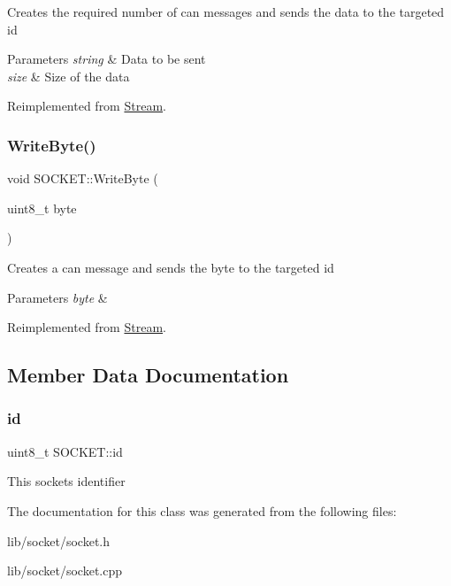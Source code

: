 Creates the required number of can messages and sends the data to the targeted id 
\begin{DoxyParams}{Parameters}
{\em string} & Data to be sent \\
\hline
{\em size} & Size of the data \\
\hline
\end{DoxyParams}


Reimplemented from \hyperlink{class_stream_a508be3423e4d99ab2757275fb723002a}{Stream}.

\hypertarget{class_s_o_c_k_e_t_abcddb460b7adf3595a813f08f3659356}{}\label{class_s_o_c_k_e_t_abcddb460b7adf3595a813f08f3659356} 
\subsubsection{\texorpdfstring{Write\+Byte()}{WriteByte()}}
{\footnotesize\ttfamily void S\+O\+C\+K\+E\+T\+::\+Write\+Byte (\begin{DoxyParamCaption}\item[{uint8\+\_\+t}]{byte }\end{DoxyParamCaption})\hspace{0.3cm}{\ttfamily [virtual]}}

Creates a can message and sends the byte to the targeted id 
\begin{DoxyParams}{Parameters}
{\em byte} & \\
\hline
\end{DoxyParams}


Reimplemented from \hyperlink{class_stream_aeaed767b3a8d946c6f81465fa83ff17f}{Stream}.



\subsection{Member Data Documentation}
\hypertarget{class_s_o_c_k_e_t_a0755fe74751c2d94d3d1679cad9e6544}{}\label{class_s_o_c_k_e_t_a0755fe74751c2d94d3d1679cad9e6544} 
\subsubsection{\texorpdfstring{id}{id}}
{\footnotesize\ttfamily uint8\+\_\+t S\+O\+C\+K\+E\+T\+::id\hspace{0.3cm}{\ttfamily [private]}}

This sockets identifier 

The documentation for this class was generated from the following files\+:\begin{DoxyCompactItemize}
\item 
lib/socket/socket.\+h\item 
lib/socket/socket.\+cpp\end{DoxyCompactItemize}
